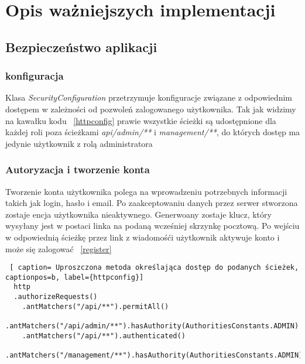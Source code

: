 	
\section{Opis ważniejszych  implementacji}

\subsection{Bezpieczeństwo aplikacji}
\subsubsection{konfiguracja}
Klasa \textit{SecurityConfiguration} przetrzymuje konfiguracje związane z odpowiednim dostępem w zależności od pozwoleń zalogowanego użytkownika. Tak jak widzimy na kawałku kodu ~\ref{httpconfig} prawie wszystkie ścieżki są udostępnione dla każdej roli poza ścieżkami \textit{api/admin/**} i \textit{management/**}, do których dostęp ma jedynie użytkownik z rolą administratora

\subsubsection{Autoryzacja i tworzenie konta}
Tworzenie konta użytkownika polega na wprowadzeniu potrzebnych informacji takich jak login, hasło i email. Po zaakceptowaniu danych przez serwer stworzona zostaje encja użytkownika nieaktywnego. Generwoany zostaje klucz, który wysyłany jest w postaci linka na podaną wcześniej skrzynkę pocztową. Po wejściu w odpowiednią ścieżkę przez link z wiadomośći użytkownik aktywuje konto i może się zalogować ~\ref{register}

\clearpage
\begin{lstlisting} [ caption= Uproszczona metoda określająca dostęp do podanych ścieżek, captionpos=b, label={httpconfig}]
  http
  .authorizeRequests()
	.antMatchers("/api/**").permitAll()
	.antMatchers("/api/admin/**").hasAuthority(AuthoritiesConstants.ADMIN)
	.antMatchers("/api/**").authenticated()
	.antMatchers("/management/**").hasAuthority(AuthoritiesConstants.ADMIN);
\end{lstlisting}


